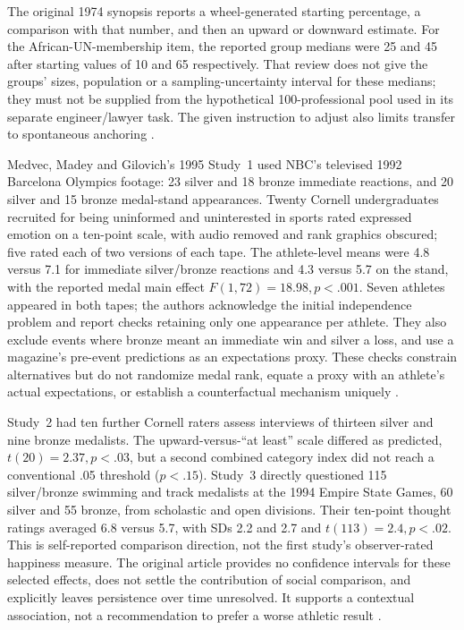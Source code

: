 The original 1974 synopsis reports a wheel-generated starting percentage,
a comparison with that number, and then an upward or downward estimate.
For the African-UN-membership item, the reported group medians were 25
and 45 after starting values of 10 and 65 respectively. That review does
not give the groups' sizes, population or a sampling-uncertainty interval
for these medians; they must not be supplied from the hypothetical
100-professional pool used in its separate engineer/lawyer task. The
given instruction to adjust also limits transfer to spontaneous
anchoring \cite[p.~1128]{TverskyKahneman1974Heuristics}.

Medvec, Madey and Gilovich's 1995 Study~1 used NBC's televised 1992
Barcelona Olympics footage: 23 silver and 18 bronze immediate reactions,
and 20 silver and 15 bronze medal-stand appearances. Twenty Cornell
undergraduates recruited for being uninformed and uninterested in sports
rated expressed emotion on a ten-point scale, with audio removed and
rank graphics obscured; five rated each of two versions of each tape.
The athlete-level means were 4.8 versus 7.1 for immediate silver/bronze
reactions and 4.3 versus 5.7 on the stand, with the reported medal main
effect \(F(1,72)=18.98,p<.001\). Seven athletes appeared in both
tapes; the authors acknowledge the initial independence problem and
report checks retaining only one appearance per athlete. They also
exclude events where bronze meant an immediate win and silver a loss,
and use a magazine's pre-event predictions as an expectations proxy.
These checks constrain alternatives but do not randomize medal rank,
equate a proxy with an athlete's actual expectations, or establish a
counterfactual mechanism uniquely
\cite[pp.~604--606]{MedvecMadeyGilovich1995Medalists}.

Study~2 had ten further Cornell raters assess interviews of thirteen
silver and nine bronze medalists. The upward-versus-``at least'' scale
differed as predicted, \(t(20)=2.37,p<.03\), but a second combined
category index did not reach a conventional .05 threshold
(\(p<.15\)). Study~3 directly questioned 115 silver/bronze swimming
and track medalists at the 1994 Empire State Games, 60 silver and
55 bronze, from scholastic and open divisions. Their ten-point thought
ratings averaged 6.8 versus 5.7, with SDs 2.2 and 2.7 and
\(t(113)=2.4,p<.02\). This is self-reported comparison direction,
not the first study's observer-rated happiness measure. The original
article provides no confidence intervals for these selected effects,
does not settle the contribution of social comparison, and explicitly
leaves persistence over time unresolved. It supports a contextual
association, not a recommendation to prefer a worse athletic result
\cite[pp.~606--609]{MedvecMadeyGilovich1995Medalists}.

